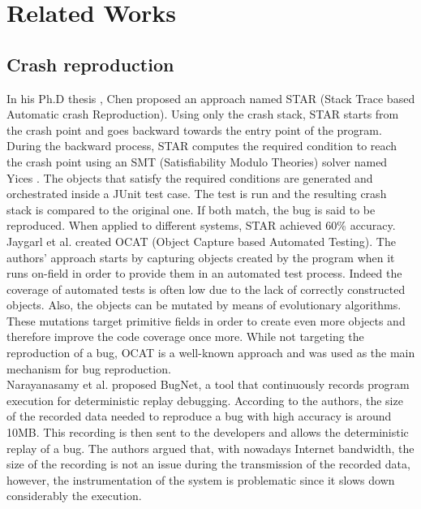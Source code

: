 
\chapter{Related Works\label{chap:relwork}}

\section{Crash reproduction}

In his Ph.D thesis \cite{Chen2013}, Chen proposed an approach named STAR (Stack Trace based Automatic crash Reproduction). 
Using only the crash stack, STAR starts from the crash point and goes backward towards the entry point of the program. 
During the backward process, STAR computes the required condition to reach the crash point using an SMT (Satisfiability Modulo Theories) solver named Yices \cite{Dutertre2006}. 
The objects that satisfy the required conditions are generated and orchestrated inside a JUnit test case. The test is run and the resulting crash stack is compared to the original one. If both match, the bug is said to be reproduced. When applied to different systems, STAR achieved 60\% accuracy. \\

Jaygarl et al. \cite{Jaygarl} created OCAT (Object Capture based Automated Testing). 
The authors’ approach starts by capturing objects created by the program when it runs on-field in order to provide them in an automated test process. Indeed the coverage of automated tests is often low due to the lack of correctly constructed objects. 
Also, the objects can be mutated by means of evolutionary algorithms. These mutations target primitive fields in order to create even more objects and therefore improve the code coverage once more. 
While not targeting the reproduction of a bug, OCAT is a well-known approach and was used as the main mechanism for bug reproduction. \\

Narayanasamy et al. \cite{Narayanasamy2005} proposed BugNet, a tool that continuously records program execution for deterministic replay debugging. According to the authors, the size of the recorded data needed to reproduce a bug with high accuracy is around 10MB. This recording is then sent to the developers and allows the deterministic replay of a bug. The authors argued that, with nowadays Internet bandwidth, the size of the recording is not an issue during the transmission of the recorded data, however, the instrumentation of the system is problematic since it slows down considerably the execution.\\

